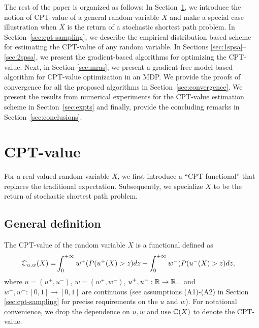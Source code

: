 \documentclass[11pt,letterpaper,english]{article}
\begin{document}
The rest of the paper is organized as follows: 
In Section~\ref{sec:cpt-val}, we introduce the notion of CPT-value of a general random variable $X$ and make a special case illustration when $X$ is the return of a stochastic shortest path problem.
In Section~\ref{sec:cpt-sampling}, we
describe the empirical distribution based scheme for estimating the CPT-value of any random variable. In Sections \ref{sec:1spsa}--\ref{sec:2spsa}, we present the gradient-based algorithms for optimizing the CPT-value. Next, in Section \ref{sec:mras}, we present a gradient-free model-based algorithm for CPT-value optimization in an MDP. We provide the proofs of convergence for all the proposed algorithms in Section~\ref{sec:convergence}.
We present the results from numerical experiments for the CPT-value estimation scheme in Section~\ref{sec:expts} and finally, provide the concluding remarks in Section~\ref{sec:conclusions}.

\section{CPT-value}
\label{sec:cpt-val}
For a real-valued random variable $X$, we first introduce a ``CPT-functional'' that replaces the traditional expectation. Subsequently, we specialize $X$ to be the return of stochastic shortest path problem.
\subsection{General definition}
The CPT-value of the random variable $X$ is a functional defined as
\begin{align}
\mathbb{C}_{u,w}(X) = &\int_0^{+\infty} w^+(P(u^+(X)>z) dz - \int_0^{+\infty} w^-(P(u^-(X)>z) dz, \label{eq:cpt-general}
\end{align}
where $u=(u^+,u^-)$, $w=(w^+,w^-)$, $u^+,u^-:\mathbb{R}\rightarrow \mathbb{R}_+$ and $w^+,w^-:[0,1] \rightarrow [0,1]$ are continuous (see assumptions (A1)-(A2) in Section \ref{sec:cpt-sampling} for precise requirements on the $u$ and $w$). For notational convenience, we drop the dependence on $u,w$ and use $\mathbb{C}(X)$ to denote the CPT-value.  
\end{document}
